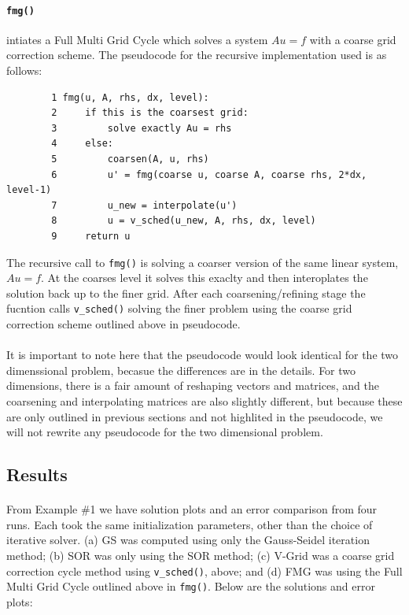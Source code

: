 \documentclass[pdftex,12pt,a4paper]{article}
\begin{document}
        \paragraph*{\lstinline{fmg()}} intiates a Full Multi Grid Cycle which solves a system $Au = f$ with a coarse grid correction scheme. The pseudocode for the recursive implementation used is as follows:
        \begin{verbatim}
        1 fmg(u, A, rhs, dx, level):
        2     if this is the coarsest grid:
        3         solve exactly Au = rhs
        4     else:
        5         coarsen(A, u, rhs)
        6         u' = fmg(coarse u, coarse A, coarse rhs, 2*dx, level-1)
        7         u_new = interpolate(u')
        8         u = v_sched(u_new, A, rhs, dx, level)
        9     return u

        \end{verbatim}
        The recursive call to \lstinline{fmg()} is solving a coarser version of the same linear system, $Au = f$. At the coarses level it solves this exaclty and then interoplates the solution back up to the finer grid. After each coarsening/refining stage the fucntion calls \lstinline{v_sched()} solving the finer problem using the coarse grid correction scheme outlined above in pseudocode. 

        \paragraph*{} It is important to note here that the pseudocode would look identical for the two dimenssional problem, becasue the differences are in the details. For two dimensions, there is a fair amount of reshaping vectors and matrices, and the coarsening and interpolating matrices are also slightly different, but because these are only outlined in previous sections and not highlited in the pseudocode, we will not rewrite any pseudocode for the two dimensional problem. 

    \subsection{Results}

        \paragraph*{} From Example \#1 we have solution plots and an error comparison from four runs. Each took the same initialization parameters, other than the choice of iterative solver. (a) GS was computed using only the Gauss-Seidel iteration method; (b) SOR was only using the SOR method; (c) V-Grid was a coarse grid correction cycle method using \lstinline{v_sched()}, above; and (d) FMG was using the Full Multi Grid Cycle outlined above in \lstinline{fmg()}. Below are the solutions and error plots:
\end{document}
